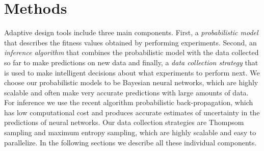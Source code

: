 \section{Methods}

Adaptive design tools include three main components. First, a
\emph{probabilistic model} that describes the fitness values obtained by
performing experiments. Second, an \emph{inference algorithm} that combines the
probabilistic model with the data collected so far to make predictions on new
data and finally, a \emph{data collection strategy} that is used to make
intelligent decisions about what experiments to perform next. We choose our
probabilistic models to be Bayesian neural networks, which are highly scalable
and often make very accurate predictions with large amounts of data. For
inference we use the recent algorithm probabilistic back-propagation, which has low computational cost and produces accurate
estimates of uncertainty in the predictions of neural networks. Our data collection strategies are Thompsom sampling and maximum entropy sampling, which are highly scalable and easy to parallelize.
In the following sections we describe all these individual components.




